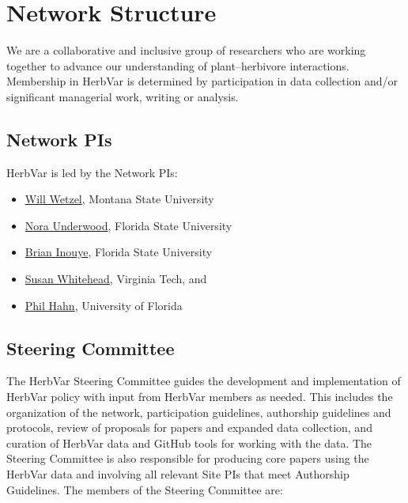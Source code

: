 \documentclass[
  letterpaper,
  oneside,
  open=any]{scrbook}
\providecommand{\tightlist}{%
  \setlength{\itemsep}{0pt}\setlength{\parskip}{0pt}}\usepackage{longtable,booktabs,array}
\begin{document}
\chapter{Network Structure}\label{sec-structure}

We are a collaborative and inclusive group of researchers who are
working together to advance our understanding of plant--herbivore
interactions. Membership in HerbVar is determined by participation in
data collection and/or significant managerial work, writing or analysis.

\section{Network PIs}\label{network-pis}

HerbVar is led by the Network PIs:

\begin{itemize}
\tightlist
\item
  \href{https://wetzellab.com/}{Will Wetzel}, Montana State University\\
\item
  \href{https://underwood-inouye-lab.weebly.com/dr-underwood1.html}{Nora
  Underwood}, Florida State University\\
\item
  \href{https://underwood-inouye-lab.weebly.com/dr-underwood1.html}{Brian
  Inouye}, Florida State University\\
\item
  \href{https://www.speciesinteractions.com/}{Susan Whitehead}, Virginia
  Tech, and\\
\item
  \href{https://plant-herbivore-interactions.net/}{Phil Hahn},
  University of Florida
\end{itemize}

\section{Steering Committee}\label{steering-committee}

The HerbVar Steering Committee guides the development and implementation
of HerbVar policy with input from HerbVar members as needed. This
includes the organization of the network, participation guidelines,
authorship guidelines and protocols, review of proposals for papers and
expanded data collection, and curation of HerbVar data and GitHub tools
for working with the data. The Steering Committee is also responsible
for producing core papers using the HerbVar data and involving all
relevant Site PIs that meet Authorship Guidelines. The members of the
Steering Committee are:
\end{document}

